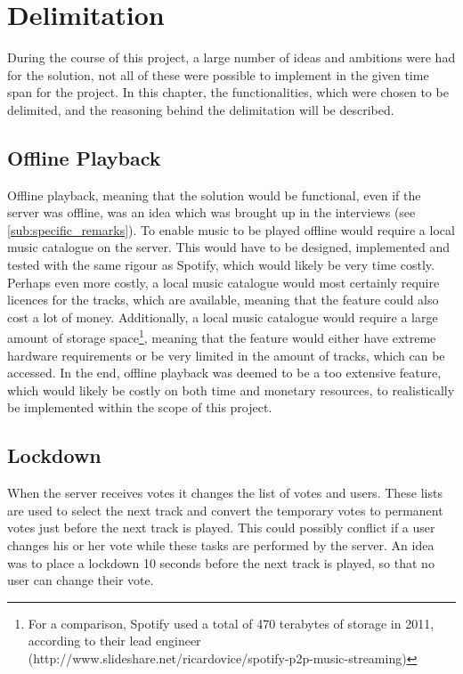 \chapter{Delimitation}
During the course of this project, a large number of ideas and ambitions were had for the solution, not all of these were possible to implement in the given time span for the project. In this chapter, the functionalities, which were chosen to be delimited, and the reasoning behind the delimitation will be described.

\section{Offline Playback}
Offline playback, meaning that the solution would be functional, even if the server was offline, was an idea which was brought up in the interviews (see \cref{sub:specific_remarks}).
To enable music to be played offline would require a local music catalogue on the server. This would have to be designed, implemented and tested with the same rigour as Spotify, which would likely be very time costly.
Perhaps even more costly, a local music catalogue would most certainly require licences for the tracks, which are available, meaning that the feature could also cost a lot of money. Additionally, a local music catalogue would require a large amount of storage space\footnote{For a comparison, Spotify used a total of 470 terabytes of storage in 2011, according to their lead engineer (http://www.slideshare.net/ricardovice/spotify-p2p-music-streaming)}, meaning that the feature would either have extreme hardware requirements or be very limited in the amount of tracks, which can be accessed.
In the end, offline playback was deemed to be a too extensive feature, which would likely be costly on both time and monetary resources, to realistically be implemented within the scope of this project.

\section{Lockdown}
When the server receives votes it changes the list of votes and
users. These lists are used to select the next track and convert the
temporary votes to permanent votes just before the next track is
played. This could possibly conflict if a user changes his or her vote
while these tasks are performed by the server.
An idea was to place a lockdown 10 seconds before the next track is played, so that no user can change their vote.

